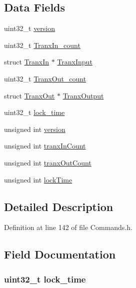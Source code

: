\subsection*{Data Fields}
\begin{DoxyCompactItemize}
\item 
uint32\_\-t \hyperlink{struct_cmd_tranx_acd99bb05ca015e7d74448acb1deba7ca}{version}
\item 
uint32\_\-t \hyperlink{struct_cmd_tranx_a29cd42e9db0010d7b5bb283bf2604765}{TranxIn\_\-count}
\item 
struct \hyperlink{struct_tranx_in}{TranxIn} $\ast$ \hyperlink{struct_cmd_tranx_a5b66f083197ffa9abe32484db40fcd39}{TranxInput}
\item 
uint32\_\-t \hyperlink{struct_cmd_tranx_a64038348b38f758be9417994e2f823a3}{TranxOut\_\-count}
\item 
struct \hyperlink{struct_tranx_out}{TranxOut} $\ast$ \hyperlink{struct_cmd_tranx_afd763f710fae1f1cefe4c6260c1a5568}{TranxOutput}
\item 
uint32\_\-t \hyperlink{struct_cmd_tranx_a54e5a5f03919a5838067d81ddc5efda4}{lock\_\-time}
\item 
unsigned int \hyperlink{struct_cmd_tranx_a5408ac5df4c170828874e1b10b4c35a0}{version}
\item 
unsigned int \hyperlink{struct_cmd_tranx_aee4a92ad1604309b8526009831b57c58}{tranxInCount}
\item 
unsigned int \hyperlink{struct_cmd_tranx_a6508946c345b4ea761a9d66c38a5fe7a}{tranxOutCount}
\item 
unsigned int \hyperlink{struct_cmd_tranx_ace6436ac55ff63b037da554bf1ddfc32}{lockTime}
\end{DoxyCompactItemize}


\subsection{Detailed Description}


Definition at line 142 of file Commands.h.



\subsection{Field Documentation}
\hypertarget{struct_cmd_tranx_a54e5a5f03919a5838067d81ddc5efda4}{
\subsubsection[{lock\_\-time}]{\setlength{\rightskip}{0pt plus 5cm}uint32\_\-t {\bf lock\_\-time}}}
\label{struct_cmd_tranx_a54e5a5f03919a5838067d81ddc5efda4}


